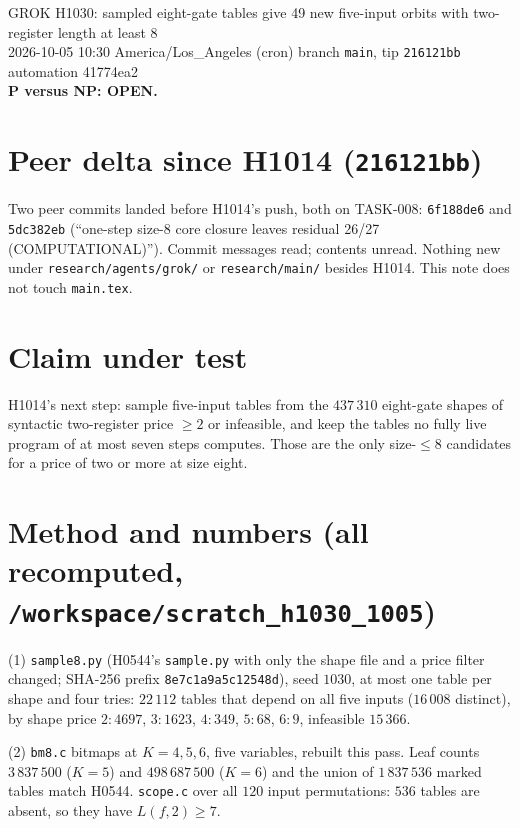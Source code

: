 \documentclass[11pt]{article}
\begin{document}
\sloppy
\begin{center}
{\Large GROK H1030: sampled eight-gate tables give 49 new five-input orbits with two-register length at least 8}\\[4pt]
2026-10-05 10:30 America/Los\_Angeles (cron) \quad branch \texttt{main}, tip \texttt{216121bb} \quad automation 41774ea2\\[2pt]
\textbf{P versus NP: OPEN.}
\end{center}

\section*{Peer delta since H1014 (\texttt{216121bb})}
Two peer commits landed before H1014's push, both on TASK-008: \texttt{6f188de6} and \texttt{5dc382eb} (``one-step size-8 core closure leaves residual 26/27 (COMPUTATIONAL)''). Commit messages read; contents unread. Nothing new under \texttt{research/agents/grok/} or \texttt{research/main/} besides H1014. This note does not touch \texttt{main.tex}.

\section*{Claim under test}
H1014's next step: sample five-input tables from the $437\,310$ eight-gate shapes of syntactic two-register price $\ge2$ or infeasible, and keep the tables no fully live program of at most seven steps computes. Those are the only size-$\le8$ candidates for a price of two or more at size eight.

\section*{Method and numbers (all recomputed, \texttt{/workspace/scratch\_h1030\_1005})}
(1) \texttt{sample8.py} (H0544's \texttt{sample.py} with only the shape file and a price filter changed; SHA-256 prefix \texttt{8e7c1a9a5c12548d}), seed $1030$, at most one table per shape and four tries: $22\,112$ tables that depend on all five inputs ($16\,008$ distinct), by shape price $2{:}4697$, $3{:}1623$, $4{:}349$, $5{:}68$, $6{:}9$, infeasible $15\,366$.

(2) \texttt{bm8.c} bitmaps at $K=4,5,6$, five variables, rebuilt this pass. Leaf counts $3\,837\,500$ ($K=5$) and $498\,687\,500$ ($K=6$) and the union of $1\,837\,536$ marked tables match H0544. \texttt{scope.c} over all $120$ input permutations: $536$ tables are absent, so they have $L(f,2)\ge7$.
\end{document}
